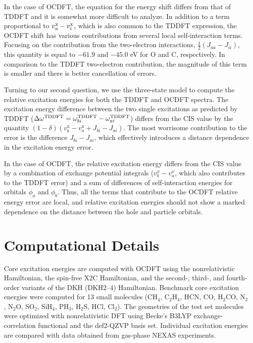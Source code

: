 \documentclass{article}
\begin{document}
In the case of OCDFT, the equation for the energy shift differs from that of TDDFT and it is somewhat more difficult to analyze.
In addition to a term proportional to $v^{\rm x}_{a} -v^{\rm x}_{i}$, which is also common to the TDDFT expression, the OCDFT shift has various contributions from several local self-interaction terms.
Focusing on the contribution from the two-electron interactions, $\frac{1}{2}(J_{aa} - J_{ii})$, this quantity is equal to $-61.9$ and $-45.0$ eV for O and C, respectively.
In comparison to the TDDFT two-electron contribution, the magnitude of this term is smaller and there is better cancellation of errors.

Turning to our second question, we use the three-state model to compute the relative excitation energies for both the TDDFT and OCDFT spectra.
The excitation energy difference  between the two single excitations as predicted by TDDFT ($\Delta \omega^{\rm{TDDFT}} = \omega_{bi}^{\rm{TDDFT}} - \omega_{ai}^{\rm{TDDFT}}$) differs from the CIS value by the quantity $(1-\delta) \left(v^{\text{x}}_{b}-v^{\text{x}}_{a} + J_{bi} -  J_{ai}\right)$.
The most worrisome contribution to the error is the difference $J_{bi} -  J_{ai}$, which effectively introduces a distance dependence in the excitation energy error.

In the case of OCDFT, the relative excitation energy differs from the CIS value by a combination of exchange potential integrals ($v_b^x - v_a^x$, which also contributes to the TDDFT error) and a sum of differences of self-interaction energies for orbitals $\phi_a$ and $\phi_b$.
Thus, all the terms that contribute to the OCDFT relative energy error are local, and relative excitation energies should not show a marked dependence on the distance between the hole and particle orbitals.

\section{Computational Details}
Core excitation energies are computed with OCDFT using the nonrelativistic Hamiltonian, the spin-free X2C Hamiltonian, and the second-, third-, and fourth-order variants of the DKH (DKH2--4) Hamiltonian. Benchmark core excitation energies were computed for 13 small molecules (CH$_4$, C$_2$H$_4$, HCN, CO, H$_2$CO, N$_2$, N$_2$O,
 SO$_2$, SiH$_4$, PH$_3$, H$_2$S, HCl, Cl$_2$).
The geometries of the test set molecules were optimized with nonrelativistic DFT using Becke's B3LYP \cite{becke_new_1993,lee_development_1988,vosko_accurate_1980,stephens_ab_1994} exchange-correlation functional and the def2-QZVP \cite{weigend_balanced_2005,weigend_accurate_2006} basis set. Individual excitation energies are compared with data obtained from gas-phase NEXAS experiments\cite{puttner_vibrationally_1999,remmers_high-resolution_1992,CO-expt-Kedge,chen_k-shell_1989,tronc_nitrogen_1980,tronc_carbon_1979,francis_studies_1994,adachi_vibronic_1999,hitchcock_k-shell_1979,domke_carbon_1990,nayandin_angle-resolved_2001,bodeur_single-and_1990,gedat_s_1998,hudson_high-resolution_1994,cavell_chemical_1999,bodeur_photoabsorption_1985}.
\end{document}
